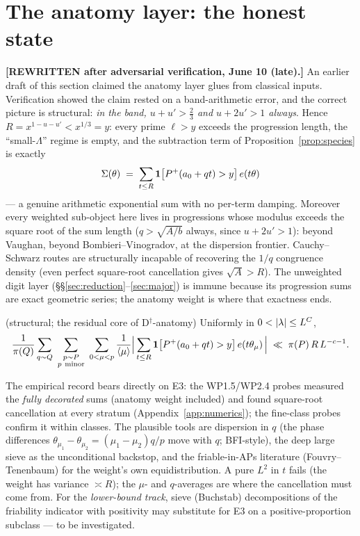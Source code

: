 \section{The anatomy layer: the honest state}\label{sec:typeII}

\textbf{[REWRITTEN after adversarial verification, June 10 (late).]}
An earlier draft of this section claimed the anatomy layer glues from
classical inputs. Verification showed the claim rested on a
band-arithmetic error, and the correct picture is structural:
\emph{in the band, $u+u'>\tfrac23$ and $u+2u'>1$ always}. Hence
$R=x^{1-u-u'}<x^{1/3}=y$: every prime $\ell>y$ exceeds the progression
length, the ``small-$\Lambda$'' regime is empty, and the subtraction
term of Proposition~\ref{prop:species} is exactly
\[
\Sigma(\theta)\;=\;\sum_{t\le R}\mathbf 1\big[P^{+}(a_0+qt)>y\big]\,
e\!\left(t\theta\right)
\]
--- a genuine arithmetic exponential sum with no per-term damping.
Moreover every weighted sub-object here lives in progressions whose
modulus exceeds the square root of the sum length ($q>\sqrt{A/b}$
always, since $u+2u'>1$): beyond Vaughan, beyond
Bombieri--Vinogradov, at the dispersion frontier. Cauchy--Schwarz
routes are structurally incapable of recovering the $1/q$ congruence
density (even perfect square-root cancellation gives
$\sqrt A>R$). The unweighted digit layer
(\S\S\ref{sec:reduction}--\ref{sec:major}) is immune because its
progression sums are exact geometric series; the anatomy weight is
where that exactness ends.

\begin{hypothesis}\label{hyp:E3}
\statusO{} (structural; the residual core of D$^\dagger$-anatomy)\quad
Uniformly in $0<|\lambda|\le\Llog^{C}$,
\[
\frac{1}{\pi(Q)}\sum_{q\sim Q}\ \sum_{\substack{p\sim P\\
p\ \mathrm{minor}}}\ \sum_{0<\mu<p}\frac{1}{\langle\mu\rangle}
\Big|\sum_{t\le R}\mathbf 1\big[P^{+}(a_0+qt)>y\big]\,\e{t\theta_\mu}
\Big|\;\ll\;\pi(P)\,R\,\Llog^{-c-1}.
\]
\end{hypothesis}

\begin{remark}
The empirical record bears directly on E3: the WP1.5/WP2.4 probes
measured the \emph{fully decorated} sums (anatomy weight included) and
found square-root cancellation at every stratum
(Appendix~\ref{app:numerics}); the fine-class probes confirm it within
classes. The plausible tools are dispersion in $q$ (the phase
differences $\theta_{\mu_1}-\theta_{\mu_2}=(\mu_1-\mu_2)q/p$ move with
$q$; BFI-style), the deep large sieve as the unconditional backstop,
and the friable-in-APs literature (Fouvry--Tenenbaum) for the weight's
own equidistribution. A pure $L^2$ in $t$ fails (the weight has
variance $\asymp R$); the $\mu$- and $q$-averages are where the
cancellation must come from. For the \emph{lower-bound track}, sieve
(Buchstab) decompositions of the friability indicator with positivity
may substitute for E3 on a positive-proportion subclass --- to be
investigated.
\end{remark}

